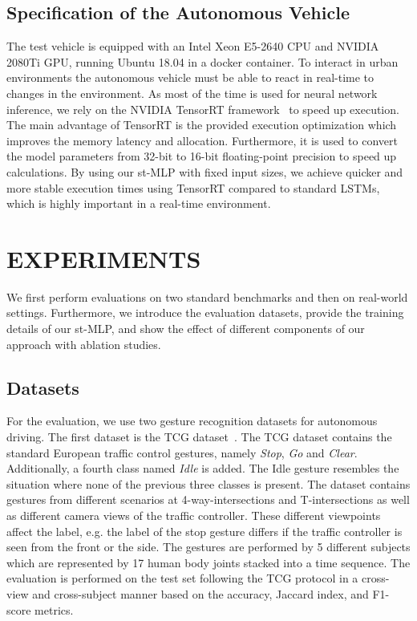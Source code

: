 \documentclass[letterpaper, 10 pt, conference]{ieeeconf}
\begin{document}
\subsection{Specification of the Autonomous Vehicle}
\label{subsec:car_specs}
The test vehicle is equipped with an Intel Xeon E5-2640 CPU and NVIDIA 2080Ti GPU, running Ubuntu 18.04 in a docker container. To interact in urban environments the autonomous vehicle must be able to react in real-time to changes in the environment. As most of the time is used for neural network inference, we rely on the NVIDIA TensorRT framework~\cite{tensorrt} to speed up execution. The main advantage of TensorRT is the provided execution optimization which improves the memory latency and allocation. Furthermore, it is used to convert the model parameters from 32-bit to 16-bit floating-point precision to speed up calculations. By using our st-MLP with fixed input sizes, we achieve quicker and more stable execution times using TensorRT compared to standard LSTMs, which is highly important in a real-time environment.


\section{EXPERIMENTS}
\label{sec:experiments}
We first perform evaluations on two standard benchmarks and then on real-world settings. Furthermore, we introduce the evaluation datasets, provide the training details of our st-MLP, and show the effect of different components of our approach with ablation studies. 

\subsection{Datasets}
\label{subsec:datasets}
For the evaluation, we use two gesture recognition datasets for autonomous driving. The first dataset is the TCG dataset~\cite{wiederer2020traffic}. The TCG dataset contains the standard European traffic control gestures, namely \textit{Stop}, \textit{Go} and \textit{Clear}. Additionally, a fourth class named \textit{Idle} is added. The Idle gesture resembles the situation where none of the previous three classes is present. The dataset contains gestures from different scenarios at 4-way-intersections and T-intersections as well as different camera views of the traffic controller. These different viewpoints affect the label, e.g. the label of the stop gesture differs if the traffic controller is seen from the front or the side. The gestures are performed by 5 different subjects which are represented by 17 human body joints stacked into a time sequence. The evaluation is performed on the test set following the TCG protocol in a cross-view and cross-subject manner based on the accuracy, Jaccard index, and F1-score metrics.
\end{document}
